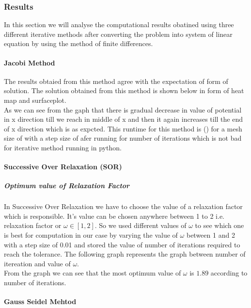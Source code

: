 \subsubsection{Results}
In this section we will analyse the computational results obatined using three different iterative methods after converting the problem into system of linear equation by using the method of finite differences. 
\paragraph{Jacobi Method}
The results obtaied from this method agree with the expectation of form of solution. The solution obtained from this method is shown below in form of heat map and surfaceplot. \\

As we can see from the gaph that there is gradual decrease in value of potential in x direction till we reach in middle of x and then it again increases till the end of x direction which is as expcted.
This runtime for this method is  \Bigg()  for a mesh size of with a step size of afer running for    number of iterations which is not bad for iterative method running in python.\\


\paragraph{Successive Over Relaxation (SOR)}

\subparagraph{Optimum value of Relaxation Factor}
In Successive Over Relaxation we have to choose the value of a relaxation factor which is responsible. It's value can be chosen anywhere between 1 to 2 i.e. relaxation factor or $ \omega  \in [1,2] $. So we used different values of $ \omega $ to see which one is best for computation in our case by varying the value of $\omega$ between 1 and 2 with a step size of 0.01 and stored the value of number of iterations  required to reach the tolerance. The following graph represents the graph between number of itereation and value of $ \omega $. \\
From the graph we can see that the most optimum value of $ \omega $ is $1.89$ according to number of iterations.
\paragraph{Gauss Seidel Mehtod} 
